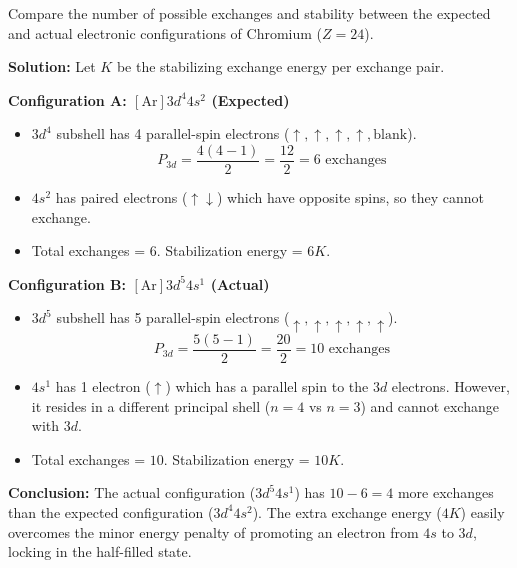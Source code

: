 \documentclass[12pt,a4paper]{article}
\begin{document}
\begin{tcolorbox}[examplebox, title={Example 2.1: Exchange Energy Comparison in Chromium ($Cr$)}]
  Compare the number of possible exchanges and stability between the expected and actual electronic configurations of Chromium ($Z=24$).
  \par\vspace{4pt}
  \textbf{Solution:}
  Let $K$ be the stabilizing exchange energy per exchange pair.
  \par\vspace{4pt}
  \textbf{Configuration A: $[\text{Ar}]3d^4 4s^2$ (Expected)}
  \begin{itemize}[leftmargin=*, itemsep=2pt]
    \item $3d^4$ subshell has 4 parallel-spin electrons ($\uparrow, \uparrow, \uparrow, \uparrow, \text{blank}$).
      \[ P_{3d} = \frac{4(4-1)}{2} = \frac{12}{2} = 6 \text{ exchanges} \]
    \item $4s^2$ has paired electrons ($\uparrow\downarrow$) which have opposite spins, so they cannot exchange.
    \item Total exchanges = $6$. Stabilization energy = $6K$.
  \end{itemize}
  \par\vspace{4pt}
  \textbf{Configuration B: $[\text{Ar}]3d^5 4s^1$ (Actual)}
  \begin{itemize}[leftmargin=*, itemsep=2pt]
    \item $3d^5$ subshell has 5 parallel-spin electrons ($\uparrow, \uparrow, \uparrow, \uparrow, \uparrow$).
      \[ P_{3d} = \frac{5(5-1)}{2} = \frac{20}{2} = 10 \text{ exchanges} \]
    \item $4s^1$ has 1 electron ($\uparrow$) which has a parallel spin to the $3d$ electrons. However, it resides in a different principal shell ($n=4$ vs $n=3$) and cannot exchange with $3d$.
    \item Total exchanges = $10$. Stabilization energy = $10K$.
  \end{itemize}
  \par\vspace{4pt}
  \textbf{Conclusion:} The actual configuration ($3d^5 4s^1$) has $10 - 6 = 4$ more exchanges than the expected configuration ($3d^4 4s^2$). The extra exchange energy ($4K$) easily overcomes the minor energy penalty of promoting an electron from $4s$ to $3d$, locking in the half-filled state.
\end{tcolorbox}
\end{document}
